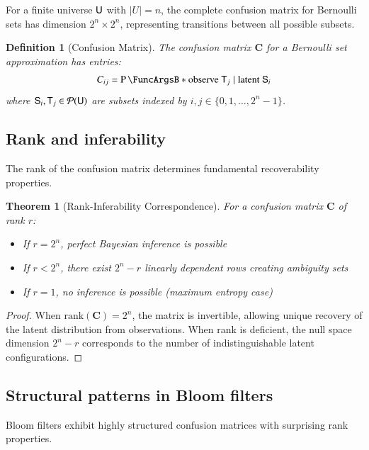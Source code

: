 \documentclass[10pt,final,hidelinks]{article}
\numberwithin{equation}{section}
\newcommand{\envnumstyle}{chapter}
\renewcommand{\envnumstyle}{chapter}
\renewcommand{\envnumstyle}{section}
\theoremstyle{plain}
\newtheorem{theorem}{Theorem}[\envnumstyle]
\newtheorem{definition}{Definition}[\envnumstyle]
\begin{document}
For a finite universe $\Set{U}$ with $|U| = n$, the complete confusion matrix for Bernoulli sets has dimension $2^n \times 2^n$, representing transitions between all possible subsets.

\begin{definition}[Confusion Matrix]
The confusion matrix $\mathbf{C}$ for a Bernoulli set approximation has entries:
\begin{equation}
C_{ij} = \Prob{\text{observe } \Set{T}_j \mid \text{latent } \Set{S}_i}
\end{equation}
where $\Set{S}_i, \Set{T}_j \in \mathcal{P}(\Set{U})$ are subsets indexed by $i,j \in \{0, 1, \ldots, 2^n-1\}$.
\end{definition}

\subsection{Rank and inferability}

The rank of the confusion matrix determines fundamental recoverability properties.

\begin{theorem}[Rank-Inferability Correspondence]
\label{thm:rank_inference}
For a confusion matrix $\mathbf{C}$ of rank $r$:
\begin{itemize}
\item If $r = 2^n$, perfect Bayesian inference is possible
\item If $r < 2^n$, there exist $2^n - r$ linearly dependent rows creating ambiguity sets
\item If $r = 1$, no inference is possible (maximum entropy case)
\end{itemize}
\end{theorem}

\begin{proof}
When $\text{rank}(\mathbf{C}) = 2^n$, the matrix is invertible, allowing unique recovery of the latent distribution from observations. When rank is deficient, the null space dimension $2^n - r$ corresponds to the number of indistinguishable latent configurations.
\end{proof}

\subsection{Structural patterns in Bloom filters}

Bloom filters exhibit highly structured confusion matrices with surprising rank properties.
\end{document}
